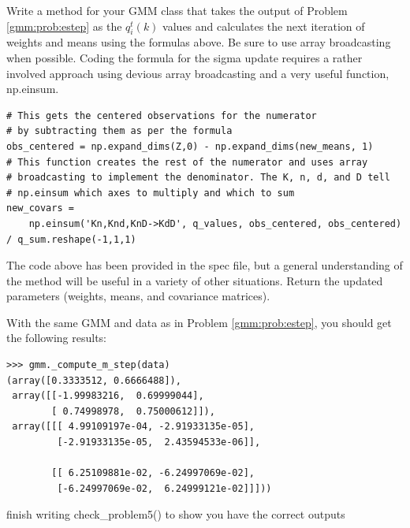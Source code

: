 \begin{problem}
\label{gmm:prob:mstep}
Write a method  for your GMM class that takes the output of Problem \ref{gmm:prob:estep} as the \(q_i^t(k)\) values 
and calculates the next iteration of weights and means using the formulas above. Be sure to use array broadcasting when possible. Coding the formula for
the sigma update requires a rather involved approach using devious array broadcasting and a very useful function, np.einsum.
\begin{lstlisting}
# This gets the centered observations for the numerator
# by subtracting them as per the formula
obs_centered = np.expand_dims(Z,0) - np.expand_dims(new_means, 1)
# This function creates the rest of the numerator and uses array
# broadcasting to implement the denominator. The K, n, d, and D tell
# np.einsum which axes to multiply and which to sum
new_covars = 
	np.einsum('Kn,Knd,KnD->KdD', q_values, obs_centered, obs_centered) / q_sum.reshape(-1,1,1)
\end{lstlisting}

The code above has been provided in the spec file, but a general understanding of the method will be useful in a variety of other situations.
Return the updated parameters (weights, means, and covariance matrices). 

With the same GMM and data as in Problem \ref{gmm:prob:estep}, you should get the following results:
\begin{lstlisting}
>>> gmm._compute_m_step(data)
(array([0.3333512, 0.6666488]),
 array([[-1.99983216,  0.69999044],
        [ 0.74998978,  0.75000612]]),
 array([[[ 4.99109197e-04, -2.91933135e-05],
         [-2.91933135e-05,  2.43594533e-06]],

        [[ 6.25109881e-02, -6.24997069e-02],
         [-6.24997069e-02,  6.24999121e-02]]]))
\end{lstlisting}

finish writing check\_problem5() to show you have the correct outputs
\end{problem}

